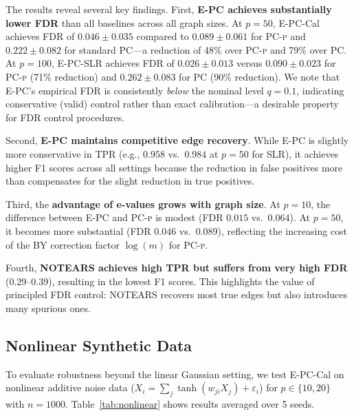 \documentclass[11pt]{article}
\newcommand{\epc}{\textsc{E-PC}}
\newcommand{\pcp}{\textsc{PC-p}}
\begin{document}
The results reveal several key findings. First, \textbf{\epc{} achieves substantially lower FDR} than all baselines across all graph sizes. At $p = 50$, \epc{}-Cal achieves FDR of $0.046 \pm 0.035$ compared to $0.089 \pm 0.061$ for \pcp{} and $0.222 \pm 0.082$ for standard PC---a reduction of 48\% over \pcp{} and 79\% over PC. At $p = 100$, \epc{}-SLR achieves FDR of $0.026 \pm 0.013$ versus $0.090 \pm 0.023$ for \pcp{} (71\% reduction) and $0.262 \pm 0.083$ for PC (90\% reduction). We note that \epc{}'s empirical FDR is consistently \emph{below} the nominal level $q = 0.1$, indicating conservative (valid) control rather than exact calibration---a desirable property for FDR control procedures.

Second, \textbf{\epc{} maintains competitive edge recovery}. While \epc{} is slightly more conservative in TPR (e.g., $0.958$ vs.\ $0.984$ at $p = 50$ for SLR), it achieves higher F1 scores across all settings because the reduction in false positives more than compensates for the slight reduction in true positives.

Third, the \textbf{advantage of e-values grows with graph size}. At $p = 10$, the difference between \epc{} and \pcp{} is modest (FDR $0.015$ vs.\ $0.064$). At $p = 50$, it becomes more substantial (FDR $0.046$ vs.\ $0.089$), reflecting the increasing cost of the BY correction factor $\log(m)$ for \pcp{}.

Fourth, \textbf{NOTEARS achieves high TPR but suffers from very high FDR} (0.29--0.39), resulting in the lowest F1 scores. This highlights the value of principled FDR control: NOTEARS recovers most true edges but also introduces many spurious ones.

\subsection{Nonlinear Synthetic Data}
\label{sec:nonlinear}

To evaluate robustness beyond the linear Gaussian setting, we test \epc{}-Cal on nonlinear additive noise data ($X_i = \sum_{j} \tanh(w_{ji} X_j) + \varepsilon_i$) for $p \in \{10, 20\}$ with $n = 1000$. Table~\ref{tab:nonlinear} shows results averaged over 5 seeds.
\end{document}
